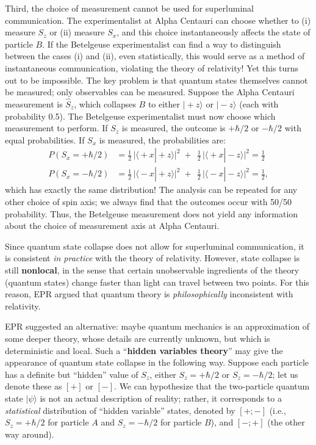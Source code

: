 \documentclass[pra,12pt]{revtex4}
\begin{document}
Third, the choice of measurement cannot be used for superluminal
communication.  The experimentalist at Alpha Centauri can choose
whether to (i) measure $S_z$ or (ii) measure $S_x$, and this choice
instantaneously affects the state of particle $B$.  If the Betelgeuse
experimentalist can find a way to distinguish between the cases (i)
and (ii), even statistically, this would serve as a method of
instantaneous communication, violating the theory of relativity!  Yet
this turns out to be impossible.  The key problem is that quantum
states themselves cannot be measured; only observables can be
measured.  Suppose the Alpha Centauri measurement is $\hat{S}_z$,
which collapses $B$ to either $|\!+\!z\rangle$ or $|\!-\!z\rangle$
(each with probability 0.5).  The Betelgeuse experimentalist must now
choose which measurement to perform.  If $S_z$ is measured, the
outcome is $+\hbar/2$ or $-\hbar/2$ with equal probabilities.  If
$S_x$ is measured, the probabilities are:
$$\begin{aligned}P(S_x = +\hbar/2) &= \frac{1}{2}\, \Big|\langle\!+x|\!+\!z\rangle\Big|^2 \;+\;\, \frac{1}{2}\, \Big|\langle\!+x|\!-\!z\rangle\Big|^2 = \frac{1}{2}\\P(S_x = -\hbar/2) &= \frac{1}{2}\, \Big|\langle\!-x|\!+\!z\rangle\Big|^2 \;+\;\, \frac{1}{2}\, \Big|\langle\!-x|\!-\!z\rangle\Big|^2 = \frac{1}{2},\end{aligned}$$
which has exactly the same distribution!  The analysis can be repeated
for any other choice of spin axis; we always find that the outcomes
occur with 50/50 probability.  Thus, the Betelgeuse measurement does
not yield any information about the choice of measurement axis at
Alpha Centauri.

Since quantum state collapse does not allow for superluminal
communication, it is consistent \textit{in practice} with the theory
of relativity.  However, state collapse is still \textbf{nonlocal}, in
the sense that certain unobservable ingredients of the theory (quantum
states) change faster than light can travel between two points.  For
this reason, EPR argued that quantum theory is
\textit{philosophically} inconsistent with relativity.

EPR suggested an alternative: maybe quantum mechanics is an
approximation of some deeper theory, whose details are currently
unknown, but which is deterministic and local.  Such a
``\textbf{hidden variables theory}'' may give the appearance of
quantum state collapse in the following way.  Suppose each particle
has a definite but ``hidden'' value of $S_z$, either $S_z = +\hbar/2$
or $S_z = -\hbar/2$; let us denote these as $[+]$ or $[-]$.  We can
hypothesize that the two-particle quantum state $|\psi\rangle$ is not
an actual description of reality; rather, it corresponds to a
\textit{statistical} distribution of ``hidden variable'' states,
denoted by $[+;-]$ (i.e., $S_z = +\hbar/2$ for particle $A$ and $S_z =
-\hbar/2$ for particle $B$), and $[-;+]$ (the other way around).
\end{document}
